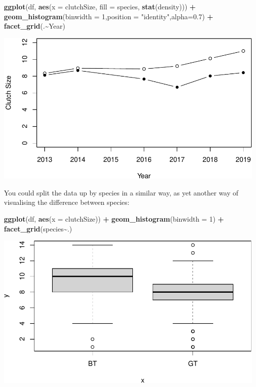 \documentclass[
  a4paperpaper,
]{book}
\newenvironment{Shaded}{\begin{snugshade}}{\end{snugshade}}
\newcommand{\DataTypeTok}[1]{\textcolor[rgb]{0.13,0.29,0.53}{#1}}
\newcommand{\DecValTok}[1]{\textcolor[rgb]{0.00,0.00,0.81}{#1}}
\newcommand{\FloatTok}[1]{\textcolor[rgb]{0.00,0.00,0.81}{#1}}
\newcommand{\KeywordTok}[1]{\textcolor[rgb]{0.13,0.29,0.53}{\textbf{#1}}}
\newcommand{\NormalTok}[1]{#1}
\newcommand{\OperatorTok}[1]{\textcolor[rgb]{0.81,0.36,0.00}{\textbf{#1}}}
\newcommand{\StringTok}[1]{\textcolor[rgb]{0.31,0.60,0.02}{#1}}
\begin{document}
\begin{Shaded}
\begin{Highlighting}[]
\KeywordTok{ggplot}\NormalTok{(df, }\KeywordTok{aes}\NormalTok{(}\DataTypeTok{x =}\NormalTok{ clutchSize, }\DataTypeTok{fill =}\NormalTok{ species, }\KeywordTok{stat}\NormalTok{(density))) }\OperatorTok{+}
\StringTok{  }\KeywordTok{geom\_histogram}\NormalTok{(}\DataTypeTok{binwidth =} \DecValTok{1}\NormalTok{,}\DataTypeTok{position =} \StringTok{"identity"}\NormalTok{,}\DataTypeTok{alpha=}\FloatTok{0.7}\NormalTok{) }\OperatorTok{+}\StringTok{ }
\StringTok{  }\KeywordTok{facet\_grid}\NormalTok{(.}\OperatorTok{\textasciitilde{}}\NormalTok{Year)}
\end{Highlighting}
\end{Shaded}

\includegraphics{BB852_files/figure-latex/unnamed-chunk-77-1.pdf}

You could split the data up by species in a similar way, as yet another way of visualising the difference between species:

\begin{Shaded}
\begin{Highlighting}[]
\KeywordTok{ggplot}\NormalTok{(df, }\KeywordTok{aes}\NormalTok{(}\DataTypeTok{x =}\NormalTok{ clutchSize)) }\OperatorTok{+}
\StringTok{  }\KeywordTok{geom\_histogram}\NormalTok{(}\DataTypeTok{binwidth =} \DecValTok{1}\NormalTok{) }\OperatorTok{+}\StringTok{ }
\StringTok{  }\KeywordTok{facet\_grid}\NormalTok{(species}\OperatorTok{\textasciitilde{}}\NormalTok{.)}
\end{Highlighting}
\end{Shaded}

\includegraphics{BB852_files/figure-latex/unnamed-chunk-78-1.pdf}
\end{document}
